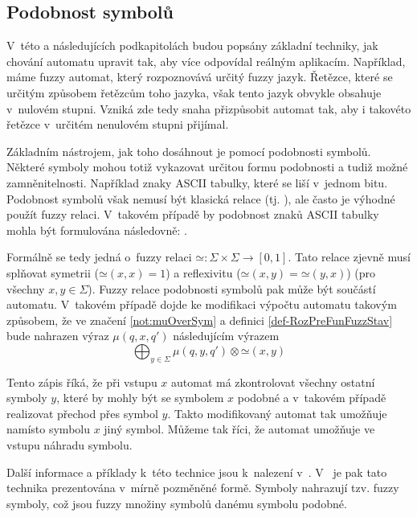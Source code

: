 \subsection{Podobnost symbolů}
V~této a následujících podkapitolách budou popsány základní techniky, jak chování automatu upravit tak, aby více odpovídal reálným aplikacím. Například, máme fuzzy automat, který rozpoznovává určitý fuzzy jazyk. Řetězce, které se určitým způsobem  řetězcům toho jazyka, však tento jazyk obvykle obsahuje v~nulovém stupni. Vzniká zde tedy snaha přizpůsobit automat tak, aby i takovéto řetězce v~určitém nenulovém stupni přijímal.

Základním nástrojem, jak toho dosáhnout je pomocí podobnosti symbolů. Některé symboly mohou totiž vykazovat určitou formu podobnosti a tudiž možné zamněnitelnosti. Například znaky ASCII tabulky, které se liší v~jednom bitu. Podobnost symbolů však nemusí být klasická  relace (tj. ), ale často je výhodné použít fuzzy relaci. V~takovém případě by podobnost znaků ASCII tabulky mohla být formulována následovně: .

Formálně se tedy jedná o~fuzzy relaci $\mathbin{\simeq}: \Sigma \times \Sigma \rightarrow [0, 1]$. Tato relace zjevně musí splňovat symetrii ($\mathbin{\simeq}(x, x) = 1$) a reflexivitu ($\mathbin{\simeq}(x, y) = \mathbin{\simeq}(y, x)$) (pro všechny $x, y \in \Sigma$).
Fuzzy relace podobnosti symbolů pak může být součástí automatu. V~takovém případě dojde ke modifikaci výpočtu automatu takovým způsobem, že ve značení \ref{not:muOverSym} a definici \ref{def-RozPreFunFuzzStav} bude nahrazen výraz $\mu(q, x, q')$ následujícím výrazem
$$
  \bigoplus_{y \in \Sigma} \mu(q, y, q') \otimes \mathbin{\simeq}(x, y)
$$

Tento zápis říká, že při vstupu $x$ automat má zkontrolovat všechny ostatní symboly $y$, které by mohly být se symbolem $x$ podobné a v~takovém případě realizovat přechod přes symbol $y$. Takto modifikovaný automat tak umožňuje namísto symbolu $x$  jiný symbol. Můžeme tak říci, že automat umožňuje ve vstupu náhradu symbolu.

Další informace a příklady k~této technice jsou k~nalezení v~\cite{RamGir-ConvFinAutFuzzAutStrComp}. V~\cite{Ech-DefSyssConPre} je pak tato technika prezentována v~mírně pozměněné formě. Symboly nahrazují tzv. fuzzy symboly, což jsou fuzzy množiny symbolů danému symbolu podobné.


